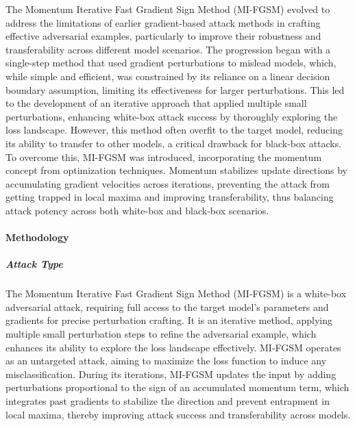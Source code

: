 \documentclass[../main.tex]{subfiles}
\begin{document}
The Momentum Iterative Fast Gradient Sign Method (MI-FGSM) evolved to address the limitations of earlier gradient-based attack methods in crafting effective adversarial examples, particularly to improve their robustness and transferability across different model scenarios. The progression began with a single-step method that used gradient perturbations to mislead models, which, while simple and efficient, was constrained by its reliance on a linear decision boundary assumption, limiting its effectiveness for larger perturbations. This led to the development of an iterative approach that applied multiple small perturbations, enhancing white-box attack success by thoroughly exploring the loss landscape. However, this method often overfit to the target model, reducing its ability to transfer to other models, a critical drawback for black-box attacks. To overcome this, MI-FGSM was introduced, incorporating the momentum concept from optimization techniques. Momentum stabilizes update directions by accumulating gradient velocities across iterations, preventing the attack from getting trapped in local maxima and improving transferability, thus balancing attack potency across both white-box and black-box scenarios.
\cite{dong2018boosting}
\paragraph{Methodology}

\subparagraph{Attack Type}
The Momentum Iterative Fast Gradient Sign Method (MI-FGSM) is a white-box adversarial attack, requiring full access to the target model's parameters and gradients for precise perturbation crafting. It is an iterative method, applying multiple small perturbation steps to refine the adversarial example, which enhances its ability to explore the loss landscape effectively. MI-FGSM operates as an untargeted attack, aiming to maximize the loss function to induce any misclassification. During its iterations, MI-FGSM updates the input by adding perturbations proportional to the sign of an accumulated momentum term, which integrates past gradients to stabilize the direction and prevent entrapment in local maxima, thereby improving attack success and transferability across models.
\end{document}
